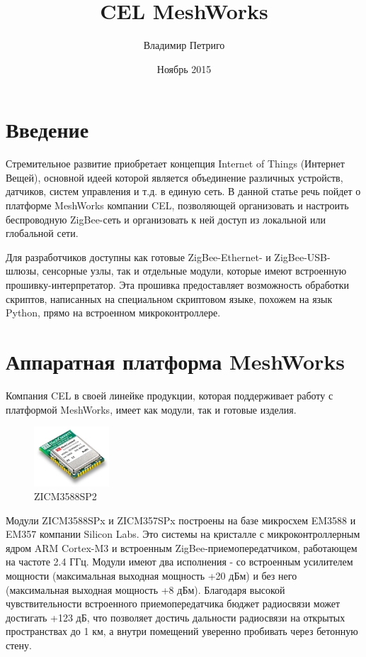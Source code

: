 \documentclass[11pt]{article}
\title{CEL MeshWorks}
\author{Владимир Петриго}
\date{Ноябрь 2015}
\begin{document}
\maketitle

\section{Введение}

Стремительное развитие приобретает концепция Internet of Things (Интернет Вещей),
основной идеей которой является объединение различных устройств, датчиков, систем
управления и т.д. в единую сеть. В данной статье речь пойдет о платформе MeshWorks 
компании CEL, позволяющей организовать и настроить беспроводную ZigBee-сеть и организовать
к ней доступ из локальной или глобальной сети.

Для разработчиков доступны как готовые ZigBee-Ethernet- и ZigBee-USB-шлюзы, 
сенсорные узлы, так и отдельные модули, которые имеют встроенную 
прошивку-интерпретатор. Эта прошивка предоставляет возможность обработки скриптов, 
написанных на специальном скриптовом языке, похожем на язык Python, прямо на 
встроенном микроконтроллере. 
\section{Аппаратная платформа MeshWorks}

Компания CEL в своей линейке продукции, которая поддерживает работу с платформой 
MeshWorks, имеет как модули, так и готовые изделия.
\begin{figure}
  \begin{center}
    \includegraphics[width=0.25\textwidth]{mc_em358x_mini.jpg}
  \end{center}
  \caption{ZICM3588SP2}
\end{figure}
Модули ZICM3588SPx и ZICM357SPx построены на базе микросхем EM3588 и EM357 компании
Silicon Labs. Это системы на кристалле с микроконтроллерным ядром ARM Cortex-M3 и
встроенным ZigBee-приемопередатчиком, работающем на частоте 2.4 ГГц. Модули имеют
два исполнения - со встроенным усилителем мощности (максимальная выходная мощность
+20 дБм) и без него (максимальная выходная мощность +8 дБм). Благодаря высокой 
чувствительности встроенного приемопередатчика бюджет радиосвязи может достигать 
+123 дБ, что позволяет достичь дальности радиосвязи на открытых пространствах до 1 км,
а внутри помещений уверенно пробивать через бетонную стену. 
\end{document}
